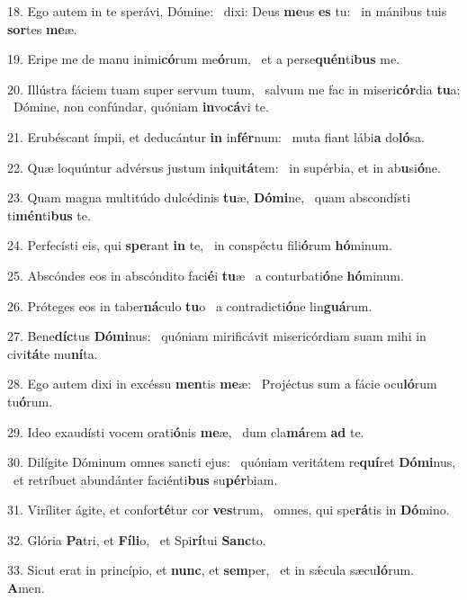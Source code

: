 18. Ego autem in te sperávi, Dómine: \dag\  dixi: Deus \textbf{me}us \textbf{es} tu: \ast\  in mánibus tuis \textbf{sor}tes \textbf{me}æ.\

19. Eripe me de manu inimi\textbf{có}rum me\textbf{ó}rum, \ast\  et a perse\textbf{quén}ti\textbf{bus} me.\

20. Illústra fáciem tuam super servum tuum, \dag\  salvum me fac in miseri\textbf{cór}dia \textbf{tu}a: \ast\  Dómine, non confúndar, quóniam \textbf{in}vo\textbf{cá}vi te.\

21. Erubéscant ímpii, et deducántur \textbf{in} in\textbf{fér}num: \ast\  muta fiant lábi\textbf{a} do\textbf{ló}sa.\

22. Quæ loquúntur advérsus justum in\textbf{i}qui\textbf{tá}tem: \ast\  in supérbia, et in ab\textbf{u}si\textbf{ó}ne.\

23. Quam magna multitúdo dulcédinis \textbf{tu}æ, \textbf{Dó}\textbf{mi}ne, \ast\  quam abscondísti ti\textbf{mén}ti\textbf{bus} te.\

24. Perfecísti eis, qui \textbf{spe}rant \textbf{in} te, \ast\  in conspéctu fili\textbf{ó}rum \textbf{hó}minum.\

25. Abscóndes eos in abscóndito faci\textbf{é}i \textbf{tu}æ \ast\  a conturbati\textbf{ó}ne \textbf{hó}minum.\

26. Próteges eos in taber\textbf{ná}culo \textbf{tu}o \ast\  a contradicti\textbf{ó}ne lin\textbf{guá}rum.\

27. Bene\textbf{díc}tus \textbf{Dó}\textbf{mi}nus: \ast\  quóniam mirificávit misericórdiam suam mihi in civi\textbf{tá}te mu\textbf{ní}ta.\

28. Ego autem dixi in excéssu \textbf{men}tis \textbf{me}æ: \ast\  Projéctus sum a fácie ocu\textbf{ló}rum tu\textbf{ó}rum.\

29. Ideo exaudísti vocem orati\textbf{ó}nis \textbf{me}æ, \ast\  dum cla\textbf{má}rem \textbf{ad} te.\

30. Dilígite Dóminum omnes sancti ejus: \dag\  quóniam veritátem re\textbf{quí}ret \textbf{Dó}\textbf{mi}nus, \ast\  et retríbuet abundánter faciénti\textbf{bus} su\textbf{pér}biam.\

31. Viríliter ágite, et confor\textbf{té}tur cor \textbf{ves}trum, \ast\  omnes, qui spe\textbf{rá}tis in \textbf{Dó}mino.\

32. Glória \textbf{Pa}tri, et \textbf{Fí}\textbf{li}o, \ast\  et Spi\textbf{rí}tui \textbf{Sanc}to.\

33. Sicut erat in princípio, et \textbf{nunc}, et \textbf{sem}per, \ast\  et in sǽcula sæcu\textbf{ló}rum. \textbf{A}men.\

